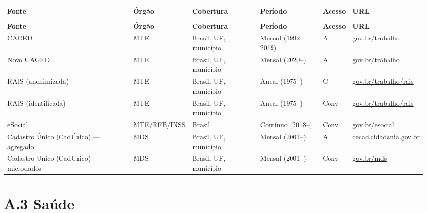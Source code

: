 {\setlength{\tabcolsep}{3pt}\footnotesize\begin{longtable}{@{} >{\raggedright\arraybackslash}p{2.9cm} >{\raggedright\arraybackslash}p{2.3cm} >{\raggedright\arraybackslash}p{2.4cm} >{\raggedright\arraybackslash}p{2.4cm} >{\raggedright\arraybackslash}p{1.1cm} >{\raggedright\arraybackslash}p{3.2cm} @{}}
\toprule
\textbf{Fonte} & \textbf{Órgão} & \textbf{Cobertura} & \textbf{Período} & \textbf{Acesso} & \textbf{URL} \\
\midrule
\endfirsthead
\multicolumn{6}{l}{\small\textit{(continuação)}} \\
\toprule
\textbf{Fonte} & \textbf{Órgão} & \textbf{Cobertura} & \textbf{Período} & \textbf{Acesso} & \textbf{URL} \\
\midrule
\endhead
\bottomrule
\endfoot

CAGED
  & MTE
  & Brasil, UF, município
  & Mensal (1992--2019)
  & A
  & \url{gov.br/trabalho} \\

Novo CAGED
  & MTE
  & Brasil, UF, município
  & Mensal (2020--)
  & A
  & \url{gov.br/trabalho} \\

RAIS (anonimizada)
  & MTE
  & Brasil, UF, município
  & Anual (1975--)
  & C
  & \url{gov.br/trabalho/rais} \\

RAIS (identificada)
  & MTE
  & Brasil, UF, município
  & Anual (1975--)
  & Conv
  & \url{gov.br/trabalho/rais} \\

eSocial
  & MTE\slash \allowbreak RFB\slash \allowbreak INSS
  & Brasil
  & Contínuo (2018--)
  & Conv
  & \url{gov.br/esocial} \\

Cadastro Único (CadÚnico) --- agregado
  & MDS
  & Brasil, UF, município
  & Mensal (2001--)
  & A
  & \url{cecad.cidadania.gov.br} \\

Cadastro Único (CadÚnico) --- microdados
  & MDS
  & Brasil, UF, município
  & Mensal (2001--)
  & Conv
  & \url{gov.br/mds} \\

\end{longtable}}

\section*{A.3 Saúde}

